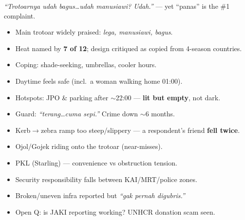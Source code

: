 \begin{tcbraster}[raster columns=2, raster equal height=rows, colback=white, colframe=soft,
  fonttitle=\bfseries\small, coltitle=ink, size=small, arc=2pt]
  \begin{tcolorbox}[title={A good sidewalk, undermined by heat\tg{neg}{PAIN \textbullet{} dominant}}]\footnotesize
    \textit{``Trotoarnya udah bagus\dots udah manusiawi? Udah.''} --- yet ``panas'' is the \#1 complaint.
    \begin{itemize}\item Main trotoar widely praised: \textit{lega, manusiawi, bagus}.
    \item Heat named by \textbf{7 of 12}; design critiqued as copied from 4-season countries.
    \item Coping: shade-seeking, umbrellas, cooler hours.\end{itemize}
  \end{tcolorbox}
  \begin{tcolorbox}[title={Safe by day, risky at isolated night spots\tg{mix}{PAIN \textbullet{} conditional}}]\footnotesize
    \begin{itemize}\item Daytime feels safe (incl.\ a woman walking home 01:00).
    \item Hotspots: JPO \& parking after $\sim$22:00 --- \textbf{lit but empty}, not dark.
    \item Guard: \textit{``terang\dots cuma sepi.''} Crime down $\sim$6 months.\end{itemize}
  \end{tcolorbox}
  \begin{tcolorbox}[title={Micro-hazards \& conflicts\tg{neg}{PAIN}}]\footnotesize
    \begin{itemize}\item Kerb$\to$zebra ramp too steep/slippery --- a respondent's friend \textbf{fell twice}.
    \item Ojol/Gojek riding onto the trotoar (near-misses).
    \item PKL (Starling) --- convenience vs obstruction tension.\end{itemize}
  \end{tcolorbox}
  \begin{tcolorbox}[title={Institutional gaps\tg{neg}{PAIN \textbullet{} systemic}}]\footnotesize
    \begin{itemize}\item Security responsibility falls between KAI/MRT/police zones.
    \item Broken/uneven infra reported but \textit{``gak pernah digubris.''}
    \item Open Q: is JAKI reporting working? UNHCR donation scam seen.\end{itemize}
  \end{tcolorbox}
\end{tcbraster}

